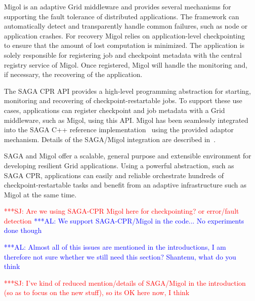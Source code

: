 \documentclass{rspublic}
\newcommand{\alnote}[1]{ {\textcolor{blue} { ***AL: #1 }}}
\newcommand{\jhanote}[1]{ {\textcolor{red} { ***SJ: #1 }}}
\newcommand{\alnote}[1]{}
\newcommand{\jhanote}[1]{}
\begin{document}
Migol is an adaptive Grid middleware and provides several mechanisms
for supporting the fault tolerance of distributed applications. The
framework can automatically detect and transparently handle common
failures, such as node or application crashes. For recovery Migol
relies on application-level checkpointing to ensure that the amount of
lost computation is minimized. The application is solely responsible
for registering job and checkpoint metadata with the central registry
service of Migol. Once registered, Migol will handle the monitoring
and, if necessary, the recovering of the application.


The SAGA CPR API provides a high-level programming abstraction for
starting, monitoring and recovering of checkpoint-restartable jobs. To
support these use cases, applications can register checkpoint and job
metadata with a Grid middleware, such as Migol, using this API.
Migol has been seamlessly integrated into the SAGA C++ reference
implementation~\citep{Kaiser:2006qp} using the provided adaptor
mechanism. Details of the SAGA/Migol integration are described
in~\citet{Luckow:2008la}.

SAGA and Migol offer a scalable, general purpose and extensible
environment for developing resilient Grid applications.  Using a
powerful abstraction, such as SAGA CPR, applications can easily and
reliable orchestrate hundreds of checkpoint-restartable tasks and
benefit from an adaptive infrastructure such as Migol at the same
time.

\jhanote{Are we using SAGA-CPR Migol here for checkpointing? or
  error/fault detection} 
\alnote{We support SAGA-CPR/Migol in the code... No experiments done though}  

\alnote{Almost all of this issues are mentioned in the introductions,
  I am therefore not sure whether we still need this section?
  Shantenu, what do you think}

\jhanote{I've kind of reduced mention/details of SAGA/Migol in the
  introduction (so as to focus on the new stuff), so its OK here now,
  I think}
\end{document}
